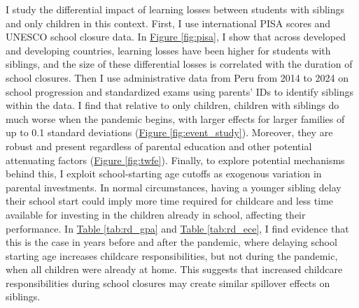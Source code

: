 \documentclass[AER]{AEA}
\begin{document}
I study the differential impact of learning losses between students with siblings and only children in this context. First, I use international PISA scores and UNESCO school closure data. In \hyperref[fig:pisa]{Figure \ref{fig:pisa}}, I show that across developed and developing countries, learning losses have been higher for students with siblings, and the size of these differential losses is correlated with the duration of school closures. Then I use administrative data from Peru from 2014 to 2024 on school progression and standardized exams using parents' IDs to identify siblings within the data. I find that relative to only children, children with siblings do much worse when the pandemic begins, with larger effects for larger families of up to 0.1 standard deviations (\hyperref[fig:event_study]{Figure \ref{fig:event_study}}). Moreover, they are robust and present regardless of parental education and other potential attenuating factors (\hyperref[fig:twfe]{Figure \ref{fig:twfe}}). Finally, to explore potential mechanisms behind this, I exploit school-starting age cutoffs as exogenous variation in parental investments. In normal circumstances, having a younger sibling delay their school start could imply more time required for childcare and less time available for investing in the children already in school, affecting their performance. In \hyperref[tab:rd_gpa]{Table \ref{tab:rd_gpa}} and \hyperref[tab:rd_ece]{Table \ref{tab:rd_ece}}, I find evidence that this is the case in years before and after the pandemic, where delaying school starting age increases childcare responsibilities, but not during the pandemic, when all children were already at home. This suggests that increased childcare responsibilities during school closures may create similar spillover effects on siblings.



\end{document}
